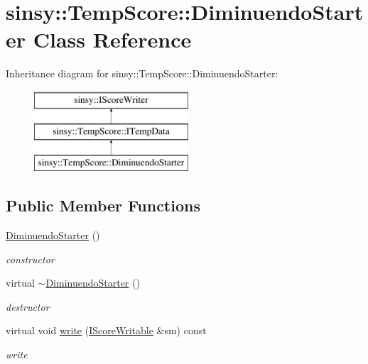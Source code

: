 \hypertarget{classsinsy_1_1TempScore_1_1DiminuendoStarter}{\section{sinsy\-:\-:\-Temp\-Score\-:\-:\-Diminuendo\-Starter \-Class \-Reference}
\label{classsinsy_1_1TempScore_1_1DiminuendoStarter}
}
\-Inheritance diagram for sinsy\-:\-:\-Temp\-Score\-:\-:\-Diminuendo\-Starter\-:\begin{figure}[H]
\begin{center}
\leavevmode
\includegraphics[height=3.000000cm]{classsinsy_1_1TempScore_1_1DiminuendoStarter}
\end{center}
\end{figure}
\subsection*{\-Public \-Member \-Functions}
\begin{DoxyCompactItemize}
\item 
\hypertarget{classsinsy_1_1TempScore_1_1DiminuendoStarter_a2a8cccbd3cd8499deedd31c14e17b207}{\hyperlink{classsinsy_1_1TempScore_1_1DiminuendoStarter_a2a8cccbd3cd8499deedd31c14e17b207}{\-Diminuendo\-Starter} ()}\label{classsinsy_1_1TempScore_1_1DiminuendoStarter_a2a8cccbd3cd8499deedd31c14e17b207}

\begin{DoxyCompactList}\small\item\em constructor \end{DoxyCompactList}\item 
\hypertarget{classsinsy_1_1TempScore_1_1DiminuendoStarter_ad6ad437359e571a6f23acb5544d91e70}{virtual \hyperlink{classsinsy_1_1TempScore_1_1DiminuendoStarter_ad6ad437359e571a6f23acb5544d91e70}{$\sim$\-Diminuendo\-Starter} ()}\label{classsinsy_1_1TempScore_1_1DiminuendoStarter_ad6ad437359e571a6f23acb5544d91e70}

\begin{DoxyCompactList}\small\item\em destructor \end{DoxyCompactList}\item 
\hypertarget{classsinsy_1_1TempScore_1_1DiminuendoStarter_ad2f63339280fe4defc467118606a97f8}{virtual void \hyperlink{classsinsy_1_1TempScore_1_1DiminuendoStarter_ad2f63339280fe4defc467118606a97f8}{write} (\hyperlink{classsinsy_1_1IScoreWritable}{\-I\-Score\-Writable} \&sm) const }\label{classsinsy_1_1TempScore_1_1DiminuendoStarter_ad2f63339280fe4defc467118606a97f8}

\begin{DoxyCompactList}\small\item\em write \end{DoxyCompactList}\end{DoxyCompactItemize}


